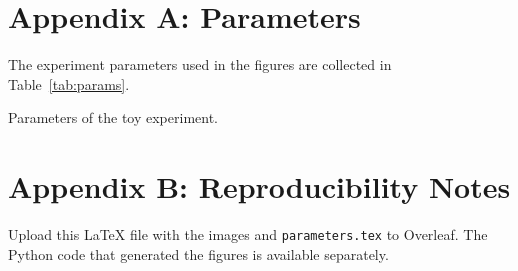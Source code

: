 \documentclass[11pt,a4paper]{article}
\begin{document}
\appendix
\section*{Appendix A: Parameters}
\noindent The experiment parameters used in the figures are collected in Table~\ref{tab:params}.
\begin{table}[h!]
\centering
\caption{Parameters of the toy experiment.}
\label{tab:params}

\end{table}

\section*{Appendix B: Reproducibility Notes}
Upload this \LaTeX{} file with the images and \texttt{parameters.tex} to Overleaf. The Python code that generated the figures is available separately.
\end{document}
